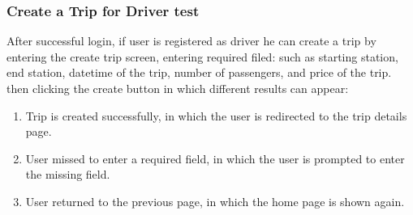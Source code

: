 \documentclass[a4paper, 12pt]{report} %
\begin{document}


            \subsubsection{Create a Trip for Driver test}
                After successful login, if user is registered as driver he can create a trip by entering the create trip screen, entering required filed: such as starting station, end station, datetime of the trip, number of passengers, and price of the trip.
                then clicking the create button in which different results can appear:
                \begin{enumerate}
                    \item Trip is created successfully, in which the user is redirected to the trip details page.
                    \item User missed to enter a required field, in which the user is prompted to enter the missing field.
                    \item User returned to the previous page, in which the home page is shown again.
                \end{enumerate}
\end{document}
